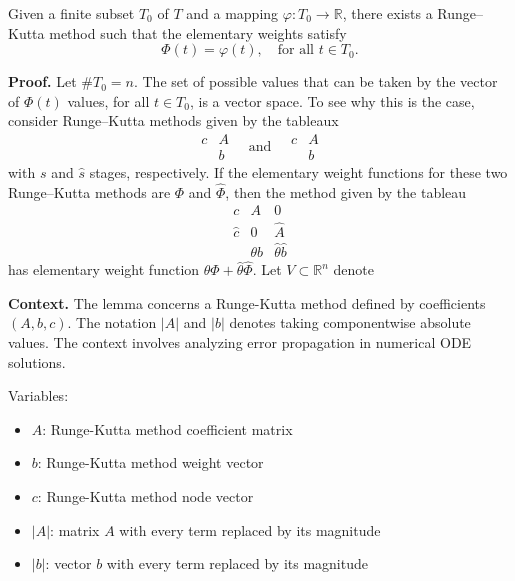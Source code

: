 \begin{theorem}

  \label{thm:317A}
Given a finite subset \( T_{0} \) of \( T \) and a mapping \( \varphi : T_{0} \to \mathbb{R} \),
there exists a Runge--Kutta method such that the elementary weights satisfy
\[
\Phi(t) = \varphi(t), \quad \text{for all } t \in T_{0}.
\]

\textbf{Proof.}
Let \( \#T_{0} = n \). The set of possible values that can be taken by the
vector of \( \Phi(t) \) values, for all \( t \in T_{0} \), is a vector space. To see why this is the
case, consider Runge--Kutta methods given by the tableaux
\[
\begin{array}{ccc}
c & A \\
& b
\end{array}
\quad \text{and} \quad
\begin{array}{ccc}
c & A \\
& b
\end{array}
\tag{317a}
\]
with \( s \) and \( \widehat{s} \) stages, respectively. If the elementary weight functions for these
two Runge--Kutta methods are \( \Phi \) and \( \widehat{\Phi} \), then the method given by the tableau
\[
\begin{array}{ccc}
c & A & 0 \\
\widehat{c} & 0 & \widehat{A} \\
& \theta b & \widehat{\theta}\widehat{b}
\end{array}
\]
has elementary weight function \( \theta\Phi + \widehat{\theta}\widehat{\Phi} \). Let \( V \subset \mathbb{R}^{n} \) denote
\end{theorem}

\noindent\textbf{Context.}
The lemma concerns a Runge-Kutta method defined by coefficients $(A, b, c)$. The notation $|A|$ and $|b|$ denotes taking componentwise absolute values. The context involves analyzing error propagation in numerical ODE solutions.

Variables:
\begin{itemize}
    \item $A$: Runge-Kutta method coefficient matrix
    \item $b$: Runge-Kutta method weight vector
    \item $c$: Runge-Kutta method node vector
    \item $|A|$: matrix $A$ with every term replaced by its magnitude
    \item $|b|$: vector $b$ with every term replaced by its magnitude
\end{itemize}

